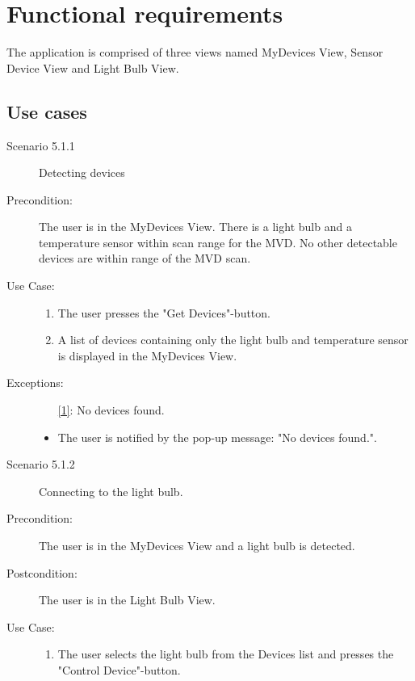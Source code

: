 \documentclass[a4paper]{article}
\begin{document}
\section{Functional requirements}

The application is comprised of three views named MyDevices View, Sensor Device View and Light Bulb View. 

\subsection{Use cases}
\begin{description}
\item[Scenario 5.1.1] Detecting devices
\item[Precondition:] The user is in the MyDevices View. There is a light bulb and a temperature sensor within scan range for the MVD. No other detectable devices are within range of the MVD scan.
\item[Use Case:]\mbox{}
\begin{enumerate}
\item The user presses the "Get Devices"-button.
\item \label{1} A list of devices containing only the light bulb and temperature sensor is displayed in the MyDevices View.
\end{enumerate}

\item[Exceptions:]
\item[]
\begin{itemize}
\item [\ref{1}:] No devices found.
\item The user is notified by the pop-up message: "No devices found.".
\end{itemize}

\item[]

\item[Scenario 5.1.2] Connecting to the light bulb.
\item[Precondition:] The user is in the MyDevices View and a light bulb is detected.
\item[Postcondition:] The user is in the Light Bulb View.
\item[Use Case:]\mbox{}
\begin{enumerate}
\item \label{1_bulb} The user selects the light bulb from the Devices list and presses the "Control Device"-button.
\end{enumerate}


\end{description}
\end{document}
